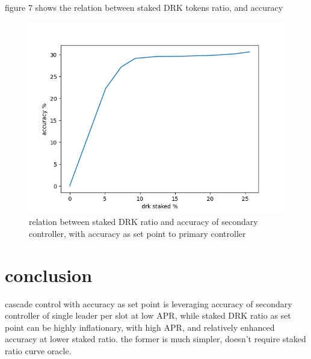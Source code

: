 \documentclass{article}
\begin{document}
\begin{description}
\item figure 7 shows the relation between staked DRK tokens ratio, and accuracy
\end{description}
\begin{figure}
  \includegraphics{acc_stake_1000nodes_10kslots_with_cascade.png}
  \caption{relation between staked DRK ratio and accuracy of secondary controller, with accuracy as set point to primary controller}
\end{figure}


\section{conclusion}
cascade control with accuracy as set point is leveraging accuracy of secondary controller of single leader per slot at low APR, while staked DRK ratio as set point can be highly inflationary, with high APR, and relatively enhanced accuracy at lower staked ratio. the former is much simpler, doesn't require staked ratio curve oracle.
\end{document}
